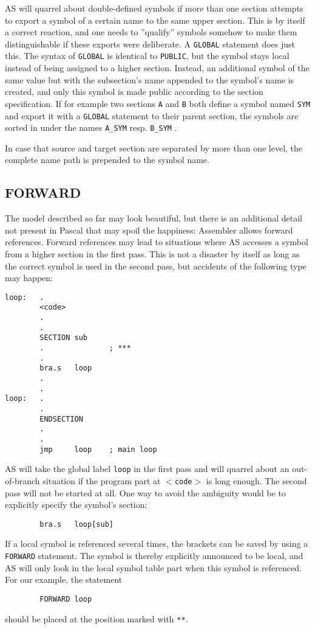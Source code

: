 \documentclass[12pt,twoside]{report}
\makeatletter
\newcommand{\tty}[1]{{\tt #1}}
\newcommand{\ttindex}[1]{\index{#1@{\tt #1}}}
\makeatother
\begin{document}
AS will quarrel about double-defined symbols if more than one section
attempts to export a symbol of a certain name to the same upper section.
This is by itself a correct reaction, and one needs to ''qualify'' symbols
somehow to make them distinguishable if these exports were deliberate.  A
\tty{GLOBAL} statement does just this.  The syntax of \tty{GLOBAL} is
identical to \tty{PUBLIC}, but the symbol stays local instead of being
assigned to a higher section.  Instead, an additional symbol of the same
value but with the subsection's name appended to the symbol's name is
created, and only this symbol is made public according to the section
specification.  If for example two sections \tty{A} and \tty{B} both
define a symbol named \tty{SYM} and export it with a \tty{GLOBAL}
statement to their parent section, the symbols are sorted in under the
names \tty{A\_SYM} resp. \tty{B\_SYM} .

In case that source and target section are separated by more than one
level, the complete name path is prepended to the symbol name.


\subsection{FORWARD}
\ttindex{FORWARD}

The model described so far may look beautiful, but there is an
additional detail not present in Pascal that may spoil the happiness:
Assembler allows forward references.  Forward references may lead to
situations where AS accesses a symbol from a higher section in the
first pass.  This is not a disaster by itself as long as the correct
symbol is used in the second pass, but accidents of the following
type may happen:
\begin{verbatim}
loop:   .
        <code>
        .
        .
        SECTION sub
        .               ; ***
        .
        bra.s   loop
        .
        .
loop:   .
        .
        ENDSECTION
        .
        .
        jmp     loop    ; main loop
\end{verbatim}
AS will take the global label \tty{loop} in the first pass and will
quarrel about an out-of-branch situation if the program part at
\tty{$<$code$>$} is long enough.  The second pass will not be
started at all.  One way to avoid the ambiguity would be to
explicitly specify the symbol's section:
\begin{verbatim}
        bra.s   loop[sub]
\end{verbatim}
If a local symbol is referenced several times, the brackets can be saved
by using a \tty{FORWARD} statement.  The symbol is thereby explicitly
announced to be local, and AS will only look in the local symbol table
part when this symbol is referenced.  For our example, the statement
\begin{verbatim}
        FORWARD loop
\end{verbatim}
should be placed at the position marked with \tty{***}.
\end{document}

